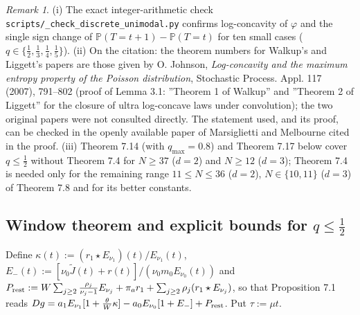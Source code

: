 \documentclass[11pt,a4paper]{article}
\theoremstyle{definition}
\theoremstyle{remark}
\newtheorem{remark}[theorem]{Remark}
\begin{document}
\begin{remark}
(i) The exact integer-arithmetic check \texttt{scripts/\_\allowbreak check\_\allowbreak discrete\_\allowbreak unimodal.py} confirms log-concavity of $\varphi$ and the single sign change of $\mathbb P(T=t+1)-\mathbb P(T=t)$ for ten small cases ($q\in\{\frac12,\frac13,\frac14,\frac15\}$). (ii) On the citation: the theorem numbers for Walkup's and Liggett's papers are those given by O. Johnson, \emph{Log-concavity and the maximum entropy property of the Poisson distribution}, Stochastic Process. Appl. 117 (2007), 791–802 (proof of Lemma 3.1: ''Theorem 1 of Walkup'' and ''Theorem 2 of Liggett'' for the closure of ultra log-concave laws under convolution); the two original papers were not consulted directly. The statement used, and its proof, can be checked in the openly available paper of Marsiglietti and Melbourne cited in the proof. (iii) Theorem 7.14 (with $q_{\max}=0.8$) and Theorem 7.17 below cover $q\le\frac12$ without Theorem 7.4 for $N\ge37$ ($d=2$) and $N\ge12$ ($d=3$); Theorem 7.4 is needed only for the remaining range $11\le N\le36$ ($d=2$), $N\in\{10,11\}$ ($d=3$) of Theorem 7.8 and for its better constants.

\end{remark}

\subsection{Window theorem and explicit bounds for $q\le\frac12$}

Define $\kappa(t):=(r_1\star E_{\nu_1})(t)/E_{\nu_1}(t)$, $E_-(t):=[\nu_0\tilde J(t)+r(t)]/(\nu_0m_0E_{\nu_0}(t))$ and $P_{\rm rest}:=W\sum_{j\ge2}\frac{\rho_j}{\nu_j-1}E_{\nu_j}+\pi_ar_1+\sum_{j\ge2}\rho_j(r_1\star E_{\nu_j})$, so that Proposition 7.1 reads $Dg=a_1E_{\nu_1}[1+\frac\theta W\kappa]-a_0E_{\nu_0}[1+E_-]+P_{\rm rest}$. Put $\tau:=\mu t$.
\end{document}

